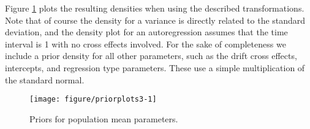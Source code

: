 \documentclass[nojss]{jss}\usepackage[]{graphicx}\usepackage[]{color}
\makeatletter
\def\maxwidth{ %
  \ifdim\Gin@nat@width>\linewidth
    \linewidth
  \else
    \Gin@nat@width
  \fi
}
\newenvironment{knitrout}{}{} %
\makeatother
\begin{document}
Figure \ref{fig:priorplots} plots the resulting densities when using the described transformations. Note that of course the density for a variance is directly related to the standard deviation, and the density plot for an autoregression assumes that the time interval is 1 with no cross effects involved. For the sake of completeness we include a prior density for all other parameters, such as the drift cross effects, intercepts, and regression type parameters. These use a simple multiplication of the standard normal.
\newline

\begin{figure}
\begin{knitrout}\small
{}\color{fgcolor}

{\centering \texttt{[image: figure/priorplots3-1]} 

}



\end{knitrout}
\caption{Priors for population mean parameters.}
\label{fig:priorplots}
\end{figure}


\end{document}
